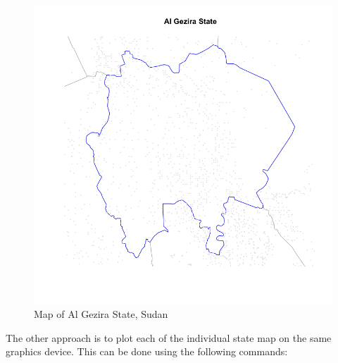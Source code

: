 \documentclass[12pt,a4paper,a4paper]{book}
\theoremstyle{definition}
\theoremstyle{definition}
\theoremstyle{definition}
\theoremstyle{remark}
\begin{document}
~

\begin{figure}[H]

{\centering \includegraphics{figures/map14-1} 

}

\caption{Map of Al Gezira State, Sudan}\label{fig:map14}
\end{figure}

\newpage

The other approach is to plot each of the individual state map on the
same graphics device. This can be done using the following commands:

~
\end{document}
